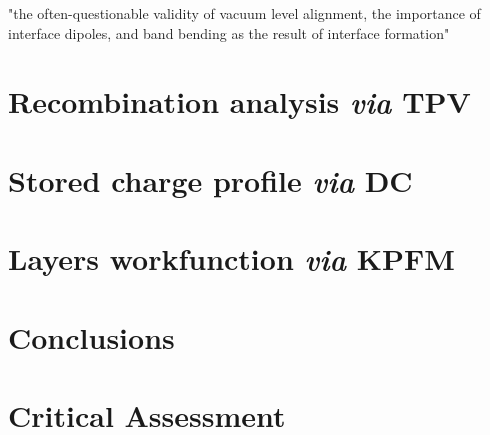 "the often-questionable validity of vacuum level alignment, the importance of interface dipoles, and band bending as the result of interface formation" \cite{Schulz2019}


\section{Recombination analysis \textit{via} TPV}
\section{Stored charge profile \textit{via} DC}
\section{Layers workfunction \textit{via} KPFM}
\section{Conclusions}
\section{Critical Assessment}